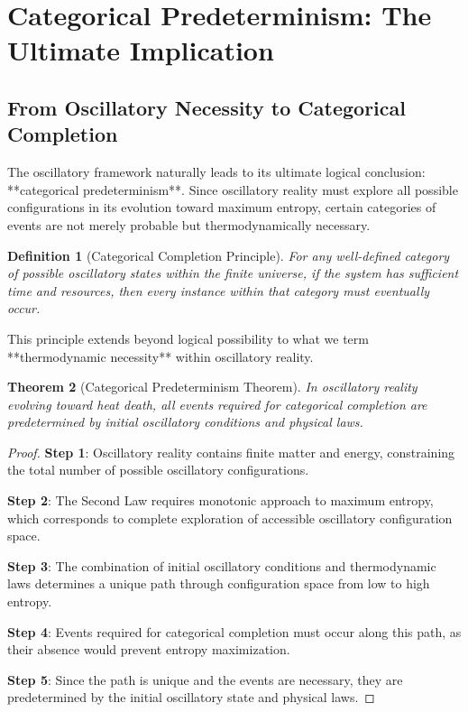 \documentclass[11pt]{article}
\newtheorem{theorem}{Theorem}[section]
\newtheorem{definition}[theorem]{Definition}
\theoremstyle{remark}
\begin{document}
\section{Categorical Predeterminism: The Ultimate Implication}

\subsection{From Oscillatory Necessity to Categorical Completion}

The oscillatory framework naturally leads to its ultimate logical conclusion: **categorical predeterminism**. Since oscillatory reality must explore all possible configurations in its evolution toward maximum entropy, certain categories of events are not merely probable but thermodynamically necessary.

\begin{definition}[Categorical Completion Principle]
For any well-defined category of possible oscillatory states within the finite universe, if the system has sufficient time and resources, then every instance within that category must eventually occur.
\end{definition}

This principle extends beyond logical possibility to what we term **thermodynamic necessity** within oscillatory reality.

\begin{theorem}[Categorical Predeterminism Theorem]
In oscillatory reality evolving toward heat death, all events required for categorical completion are predetermined by initial oscillatory conditions and physical laws.
\end{theorem}

\begin{proof}
\textbf{Step 1}: Oscillatory reality contains finite matter and energy, constraining the total number of possible oscillatory configurations.

\textbf{Step 2}: The Second Law requires monotonic approach to maximum entropy, which corresponds to complete exploration of accessible oscillatory configuration space.

\textbf{Step 3}: The combination of initial oscillatory conditions and thermodynamic laws determines a unique path through configuration space from low to high entropy.

\textbf{Step 4}: Events required for categorical completion must occur along this path, as their absence would prevent entropy maximization.

\textbf{Step 5}: Since the path is unique and the events are necessary, they are predetermined by the initial oscillatory state and physical laws.
\end{proof}
\end{document}
